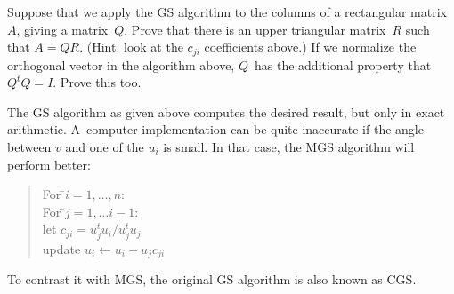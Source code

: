 \begin{exercise}
  Suppose that we apply the \ac{GS} algorithm to the columns of a
  rectangular matrix~$A$, giving a matrix~$Q$. Prove that there is an
  upper triangular matrix~$R$ such that $A=QR$. (Hint: look at the
  $c_{ji}$ coefficients above.) If we normalize the
  orthogonal vector in the algorithm above, $Q$~has the additional property
  that $Q^tQ=I$. Prove this too.
\end{exercise}

The \ac{GS} algorithm as given above computes the desired result,
but only in exact arithmetic. A~computer implementation can be quite
inaccurate if the angle between $v$ and one of the $u_i$ is small. In
that case, the \acf{MGS} algorithm will
perform better:

\begin{quote}
  \begin{tabbing}
    For \=$i=1,\ldots,n$:\\
    \> For \=$j=1,\ldots i-1$:\\
    \>\>let $c_{ji}=u_j^tu_i/u_j^tu_j$\\
    \>\> update $u_i\leftarrow u_i-u_jc_{ji}$
  \end{tabbing}
\end{quote}

To contrast it with \ac{MGS}, the original \ac{GS} algorithm is also
known as \acf{CGS}.

